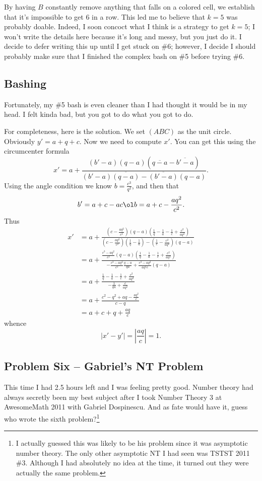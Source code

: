 \documentclass[11pt]{scrartcl}
\begin{document}
By having $B$ constantly remove anything that falls on a colored cell,
we establish that it's impossible to get $6$ in a row.
This led me to believe that $k=5$ was probably doable.
Indeed, I soon concoct what I think is a strategy to get $k=5$;
I won't write the details here because it's long and messy, but you just do it.
I decide to defer writing this up until I get stuck on \#6; however,
I decide I should probably make sure that I finished the complex bash on \#5 before trying \#6.


\subsection{Bashing}
Fortunately, my \#5 bash is even cleaner than I had thought it would be in my head.
I felt kinda bad, but you got to do what you got to do. %

For completeness, here is the solution.
We set $(ABC)$ as the unit circle.
Obviously $y' = a + q + c$. Now we need to compute $x'$.
You can get this using the circumcenter formula
\[ x' = a + \frac{(b'-a)(q-a)\left( \overline{q-a}-\overline{b'-a} \right)}
  {(b'-a)\overline{(q-a)} - \overline{(b'-a)}(q-a)}. \]
Using the angle condition we know $b = \frac{c^3}{q^2}$,
and then that
\[ b' = a+c - ac\ol b = a+c-\frac{aq^2}{c^2}. \]
Thus
\begin{align*}
  x' &= a + \frac{\left( c-\frac{aq^2}{c^2} \right)\left( q-a \right)\left(
  \frac 1q - \frac 1a - \frac 1c + \frac{c^2}{aq^2}  \right)}{\left(
  c-\frac{aq^2}{c^2} \right)\left( \frac 1q - \frac 1a \right) - \left( \frac 1c
  - \frac{c^2}{aq^2} \right)\left( q-a \right)} \\
  &= a + \frac{\frac{c^3-aq^2}{c^2} \left( q-a \right)\left( \frac 1q - \frac 1a
  - \frac 1c + \frac{c^2}{aq^2} \right)}{-\frac{c^3-aq^2}{c^2}\frac{q-a}{qa} + \frac{c^3-aq^2}{aq^2c}(q-a)} \\
  &= a + \frac{\frac 1q - \frac 1a - \frac 1c + \frac{c^2}{aq^2}}{-\frac{1}{qa} + \frac{c}{aq^2}} \\
  &= a + \frac{c^2-q^2 + aq-\frac{aq^2}{c}}{c-q} \\
  &= a + c + q + \frac{aq}{c}
\end{align*}
whence \[ \left\lvert x'-y' \right\rvert = \left\lvert \frac{aq}{c} \right\rvert = 1.\]

\subsection{Problem Six -- Gabriel's NT Problem}
This time I had 2.5 hours left and I was feeling pretty good.
Number theory had always secretly been my best subject after I took Number
Theory 3 at AwesomeMath 2011 with Gabriel Dospinescu.
And as fate would have it, guess who wrote the sixth problem?\footnote{I
actually guessed this was likely to be his problem since it was asymptotic number theory.
The only other asymptotic NT I had seen was TSTST 2011 \#3.
Although I had absolutely no idea at the time, it turned out they were actually the same problem.}
\end{document}
